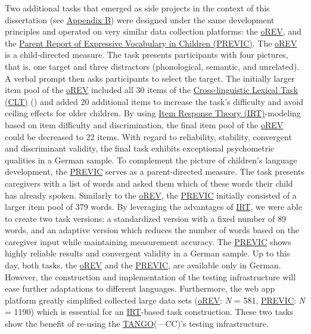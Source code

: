 \documentclass[
]{scrbook}
\begin{document}
Two additional tasks that emerged as side projects in the context of this dissertation (see \hyperref[appendixB]{Appendix B}) were designed under the same development principles and operated on very similar data collection platforms: the \hyperref[acronyms_oREV]{oREV}, and the \hyperref[acronyms_PREVIC]{Parent Report of Expressive Vocabulary in Children (PREVIC)}. The \hyperref[acronyms_oREV]{oREV} is a child-directed measure. The task presents participants with four pictures, that is, one target and three distractors (phonological, semantic, and unrelated). A verbal prompt then asks participants to select the target. The initially larger item pool of the \hyperref[acronyms_oREV]{oREV} included all 30 items of the \hyperref[acronyms_CLT]{Cross-linguistic Lexical Task (CLT)} () and added 20 additional items to increase the task's difficulty and avoid ceiling effects for older children. By using \hyperref[acronyms_IRT]{Item Response Theory (IRT)}-modeling based on item difficulty and discrimination, the final item pool of the \hyperref[acronyms_oREV]{oREV} could be decreased to 22 items. With regard to reliability, stability, convergent and discriminant validity, the final task exhibits exceptional psychometric qualities in a German sample. To complement the picture of children's language development, the \hyperref[acronyms_PREVIC]{PREVIC} serves as a parent-directed measure. The task presents caregivers with a list of words and asked them which of these words their child has already spoken. Similarly to the \hyperref[acronyms_oREV]{oREV}, the \hyperref[acronyms_PREVIC]{PREVIC} initially consisted of a larger item pool of 379 words. By leveraging the advantages of \hyperref[acronyms_IRT]{IRT}, we were able to create two task versions: a standardized version with a fixed number of 89 words, and an adaptive version which reduces the number of words based on the caregiver input while maintaining measurement accuracy. The \hyperref[acronyms_PREVIC]{PREVIC} shows highly reliable results and convergent validity in a German sample. Up to this day, both tasks, the \hyperref[acronyms_oREV]{oREV} and the \hyperref[acronyms_PREVIC]{PREVIC}, are available only in German. However, the construction and implementation of the testing infrastructure will ease further adaptations to different languages. Furthermore, the web app platform greatly simplified collected large data sets (\hyperref[acronyms_oREV]{oREV}: \emph{N} = 581, \hyperref[acronyms_PREVIC]{PREVIC}: \emph{N} = 1190) which is essential for an \hyperref[acronyms_IRT]{IRT}-based task construction. These two tasks show the benefit of re-using the \hyperref[acronyms_TANGO]{TANGO}(---CC)'s testing infrastructure.
\end{document}
